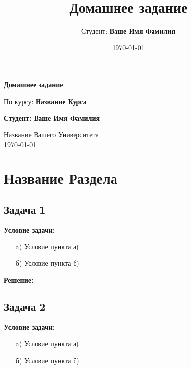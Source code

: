 \documentclass[a4paper,12pt]{article}
\title{Домашнее задание}
\author{Студент: \textbf{Ваше Имя Фамилия}}
\date{\today}
\begin{document}
\begin{titlepage}
    \centering
    \vspace*{1cm}

    \Huge
    \textbf{Домашнее задание}

    \vspace{0.5cm}
    \LARGE
    По курсу: \textbf{Название Курса}

    \vspace{1.5cm}

    \textbf{Студент: Ваше Имя Фамилия}

    \vfill

    \Large
    Название Вашего Университета\\
    \vspace{0.3cm}
    \today

\end{titlepage}

\tableofcontents
\newpage

\section{Название Раздела}

\subsection{Задача 1}
\textbf{Условие задачи:}

\begin{itemize}
    \item[a)] Условие пункта а)
    \item[б)] Условие пункта б)
\end{itemize}

\textbf{Решение:}


\vspace{1cm}

\subsection{Задача 2}
\textbf{Условие задачи:}

\begin{itemize}
    \item[a)] Условие пункта а)
    \item[б)] Условие пункта б)
\end{itemize}
\end{document}
